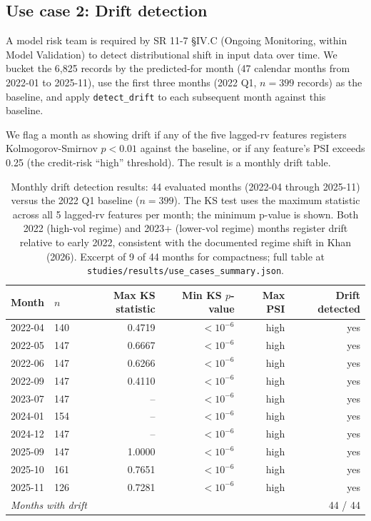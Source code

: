 \subsection{Use case 2: Drift detection}\label{sec:demonstration_drift}

A model risk team is required by SR 11-7 §IV.C (Ongoing Monitoring, within Model Validation) to detect distributional shift in input data over time. We bucket the 6,825 records by the predicted-for month (47 calendar months from 2022-01 to 2025-11), use the first three months (2022 Q1, $n=399$ records) as the baseline, and apply \texttt{detect\_drift} to each subsequent month against this baseline.

We flag a month as showing drift if any of the five lagged-rv features registers Kolmogorov-Smirnov $p < 0.01$ against the baseline, or if any feature's PSI exceeds 0.25 (the credit-risk ``high'' threshold). The result is a monthly drift table.

\begin{table}[H]
\centering
\caption{Monthly drift detection results: 44 evaluated months (2022-04 through 2025-11) versus the 2022 Q1 baseline ($n=399$). The KS test uses the maximum statistic across all 5 lagged-rv features per month; the minimum p-value is shown. Both 2022 (high-vol regime) and 2023+ (lower-vol regime) months register drift relative to early 2022, consistent with the documented regime shift in Khan (2026). Excerpt of 9 of 44 months for compactness; full table at \texttt{studies/results/use\_cases\_summary.json}.}\label{tab:drift}
\footnotesize
\begin{tabular}{llrrrr}
\toprule
Month & $n$ & Max KS statistic & Min KS $p$-value & Max PSI & Drift detected \\
\midrule
2022-04 & 140 & 0.4719 & $<10^{-6}$ & high & yes \\
2022-05 & 147 & 0.6667 & $<10^{-6}$ & high & yes \\
2022-06 & 147 & 0.6266 & $<10^{-6}$ & high & yes \\
2022-09 & 147 & 0.4110 & $<10^{-6}$ & high & yes \\
\midrule
2023-07 & 147 & --     & $<10^{-6}$ & high & yes \\
2024-01 & 154 & --     & $<10^{-6}$ & high & yes \\
2024-12 & 147 & --     & $<10^{-6}$ & high & yes \\
\midrule
2025-09 & 147 & 1.0000 & $<10^{-6}$ & high & yes \\
2025-10 & 161 & 0.7651 & $<10^{-6}$ & high & yes \\
2025-11 & 126 & 0.7281 & $<10^{-6}$ & high & yes \\
\midrule
\multicolumn{5}{l}{\textit{Months with drift}}                & 44 / 44 \\
\bottomrule
\end{tabular}
\end{table}

